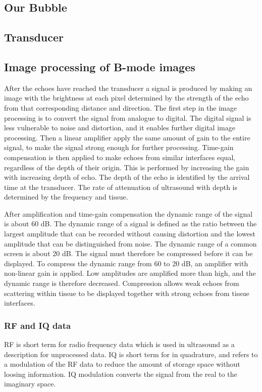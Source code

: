 \subsection{Our Bubble}
\subsection{Transducer}

\subsection{Image processing of B-mode images}
After the echoes have reached the transducer a signal is produced by making an image with the brightness at each pixel determined by the strength of the echo from that corresponding distance and direction. The first step in the image processing is to convert the signal from analogue to digital. The digital signal is less vulnerable to noise and distortion, and it enables further digital image processing. Then a linear amplifier apply the same amount of gain to the entire signal, to make the signal strong enough for further processing. Time-gain compensation is then applied to make echoes from similar interfaces equal, regardless of the depth of their origin. This is performed by increasing the gain with increasing depth of echo. The depth of the echo is identified by the arrival time at the transducer. The rate of attenuation of ultrasound with depth is determined by the frequency and tissue.

After amplification and time-gain compensation the dynamic range of the signal is about 60 dB. The dynamic range of a signal is defined as the ratio between the largest amplitude that can be recorded without causing distortion and the lowest amplitude that can be distinguished from noise. The dynamic range of a common screen is about 20 dB. The signal must therefore be compressed before it can be displayed. To compress the dynamic range from 60 to 20 dB, an amplifier with non-linear gain is applied. Low amplitudes are amplified more than high, and the dynamic range is therefore decreased. Compression allows weak echoes from scattering within tissue to be displayed together with strong echoes from tissue interfaces.

\subsubsection{RF and IQ data}
RF is short term for radio frequency data which is used in ultrasound as a description for unprocessed data. IQ is short term for in quadrature, and refers to a modulation of the RF data to reduce the amount of storage space without loosing information. IQ modulation converts the signal from the real to the imaginary space.

